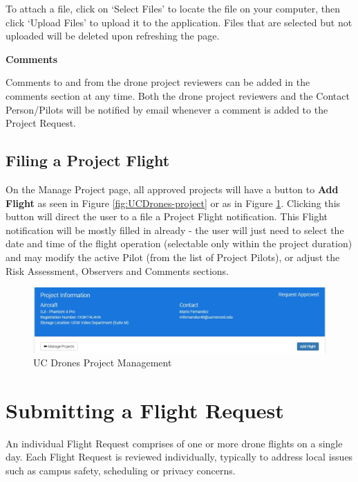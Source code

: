 \documentclass[
  12pt,
]{book}
\begin{document}
To attach a file, click on `Select Files' to locate the file on your computer, then click `Upload Files' to upload it to the application. Files that are selected but not uploaded will be deleted upon refreshing the page.

\textbf{Comments}

Comments to and from the drone project reviewers can be added in the comments section at any time. Both the drone project reviewers and the Contact Person/Pilots will be notified by email whenever a comment is added to the Project Request.

\hypertarget{filing-a-project-flight}{%
\subsection{Filing a Project Flight}\label{filing-a-project-flight}}

On the Manage Project page, all approved projects will have a button to \textbf{Add Flight} as seen in Figure \ref{fig:UCDrones-project} or as in Figure \ref{fig:UCDrones-project-flight-2}. Clicking this button will direct the user to a file a Project Flight notification. This Flight notification will be mostly filled in already - the user will just need to select the date and time of the flight operation (selectable only within the project duration) and may modify the active Pilot (from the list of Project Pilots), or adjust the Risk Assessment, Observers and Comments sections.

\begin{figure}

{\centering \includegraphics[width=0.85\linewidth]{images/UCDrones_project_addflight} 

}

\caption{UC Drones Project Management}\label{fig:UCDrones-project-flight-2}
\end{figure}

\hypertarget{submitting-a-flight-request}{%
\section{Submitting a Flight Request}\label{submitting-a-flight-request}}

An individual Flight Request comprises of one or more drone flights on a single day. Each Flight Request is reviewed individually, typically to address local issues such as campus safety, scheduling or privacy concerns.
\end{document}
